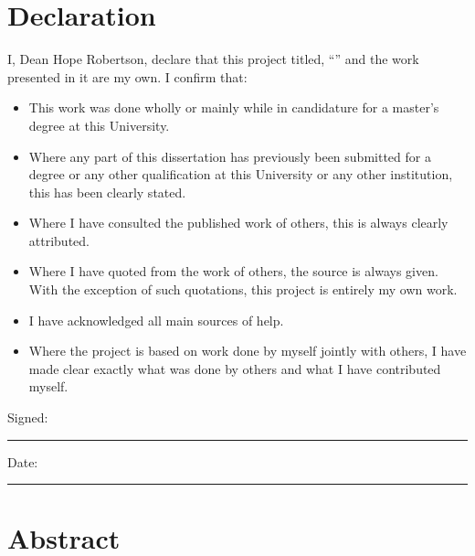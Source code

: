 \documentclass[12pt,a4paper,oneside]{report}
\begin{document}
\chapter*{\centering \large Declaration} %
\noindent I, Dean Hope Robertson, declare that this project titled, \enquote{} and the work presented in it are my own. I confirm that:

\begin{itemize} 
\item This work was done wholly or mainly while in candidature for a master's degree at this University.
\item Where any part of this dissertation has previously been submitted for a degree or any other qualification at this University or any other institution, this has been clearly stated.
\item Where I have consulted the published work of others, this is always clearly attributed.
\item Where I have quoted from the work of others, the source is always given. With the exception of such quotations, this project is entirely my own work.
\item I have acknowledged all main sources of help.
\item Where the project is based on work done by myself jointly with others, I have made clear exactly what was done by others and what I have contributed myself.
\end{itemize}
\vspace{5em}
\noindent Signed:\\
\rule[0.5em]{25em}{0.5pt} %
 
\noindent Date:\\
\rule[0.5em]{25em}{0.5pt} %
\doublespacing\textbf{}


\chapter*{\centering \large Abstract} %
\doublespacing
\end{document}
